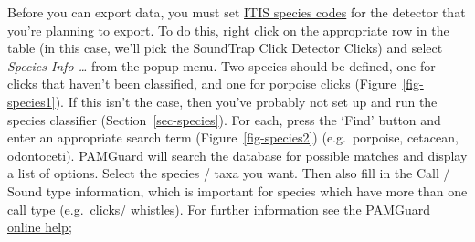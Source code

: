 \documentclass[
]{article}
\begin{document}
Before you can export data, you must set \href{https://itis.gov/}{ITIS
species codes} for the detector that you're planning to export. To do
this, right click on the appropriate row in the table (in this case,
we'll pick the SoundTrap Click Detector Clicks) and select \emph{Species
Info \ldots{}} from the popup menu. Two species should be defined, one
for clicks that haven't been classified, and one for porpoise clicks
(Figure~\ref{fig-species1}). If this isn't the case, then you've
probably not set up and run the species classifier
(Section~\ref{sec-species}). For each, press the `Find' button and enter
an appropriate search term (Figure~\ref{fig-species2}) (e.g.~porpoise,
cetacean, odontoceti). PAMGuard will search the database for possible
matches and display a list of options. Select the species / taxa you
want. Then also fill in the Call / Sound type information, which is
important for species which have more than one call type (e.g.~clicks/
whistles). For further information see the
\href{https://www.pamguard.org/olhelp/utilities/tethys/docs/tethys_speciescodes.html}{PAMGuard
online help};
\end{document}
